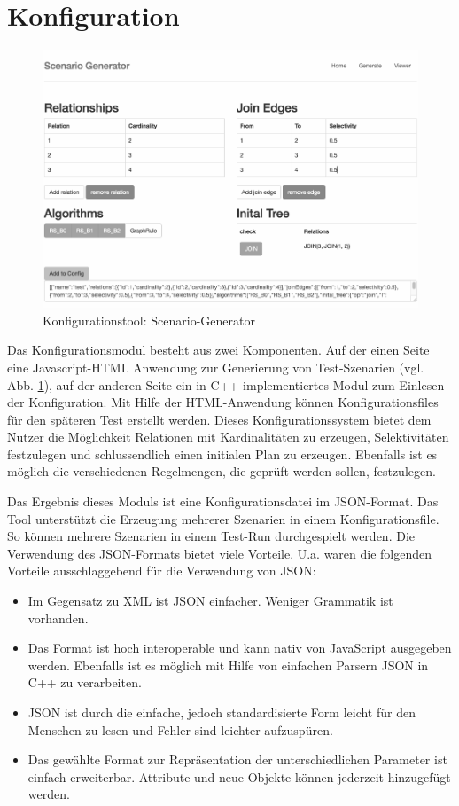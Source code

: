 \section{Konfiguration}


\begin{figure}[ht]
  \centering
  \includegraphics[width=1\textwidth]{04_Implementierung/00_media/Tool.png}
  \caption{Konfigurationstool: Scenario-Generator}
  \label{ScenarioGenerator}
\end{figure}

Das Konfigurationsmodul besteht aus zwei Komponenten. Auf der einen Seite eine Javascript-HTML Anwendung zur Generierung von Test-Szenarien (vgl. Abb. \ref{ScenarioGenerator}), auf der anderen Seite ein in C++ implementiertes Modul zum Einlesen der Konfiguration. Mit Hilfe der HTML-Anwendung können Konfigurationsfiles für den späteren Test erstellt werden. Dieses Konfigurationssystem bietet dem Nutzer die Möglichkeit Relationen mit Kardinalitäten zu erzeugen, Selektivitäten festzulegen und schlussendlich einen initialen Plan zu erzeugen. Ebenfalls ist es möglich die verschiedenen Regelmengen, die geprüft werden sollen, festzulegen.

Das Ergebnis dieses Moduls ist eine Konfigurationsdatei im JSON-Format. Das Tool unterstützt die Erzeugung mehrerer Szenarien in einem Konfigurationsfile. So können mehrere Szenarien in einem Test-Run durchgespielt werden. Die Verwendung des JSON-Formats bietet viele Vorteile. U.a. waren die folgenden Vorteile ausschlaggebend für die Verwendung von JSON:

\begin{itemize}
\item Im Gegensatz zu XML ist JSON einfacher. Weniger Grammatik ist vorhanden.
\item Das Format ist hoch interoperable und kann nativ von JavaScript ausgegeben werden. Ebenfalls ist es möglich mit Hilfe von einfachen Parsern JSON in C++ zu verarbeiten.
\item JSON ist durch die einfache, jedoch standardisierte Form leicht für den Menschen zu lesen und Fehler sind leichter aufzuspüren.
\item Das gewählte Format zur Repräsentation der unterschiedlichen Parameter ist einfach erweiterbar. Attribute und neue Objekte können jederzeit hinzugefügt werden.
\end{itemize}

